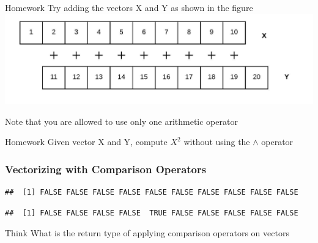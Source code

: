 \begin{DIY}{Homework}
 Try adding the vectors X and Y as shown in the figure
 \includegraphics[width=7 cm]{./viz/ext/shiftAndAdd.jpeg}
 
 Note that you are allowed to use only one arithmetic operator
\end{DIY}

\begin{DIY}{Homework}
Given vector X and Y, compute $X^2$ without using the $\wedge$ operator
\end{DIY}

\subsubsection{Vectorizing with Comparison Operators}
\begin{knitrout}
\color{fgcolor}\begin{kframe}
\begin{alltt}
\hlkwb{<-}\hlstd{(}\hlstd{,}\hlstd{)} 
\hlkwb{<-}\hlstd{(}\hlstd{,}\hlstd{)} 
 \hlopt{>}     
\end{alltt}
\begin{verbatim}
##  [1] FALSE FALSE FALSE FALSE FALSE FALSE FALSE FALSE FALSE FALSE
\end{verbatim}
\begin{alltt}
\hlstd{Y[}\hlstd{]}\hlkwb{<-}\hlstd{X[}\hlstd{]} 
 \hlopt{==}  
\end{alltt}
\begin{verbatim}
##  [1] FALSE FALSE FALSE FALSE  TRUE FALSE FALSE FALSE FALSE FALSE
\end{verbatim}
\end{kframe}
\end{knitrout}

\begin{DIY}{Think}
What is the return type of applying comparison operators on vectors
\end{DIY}

